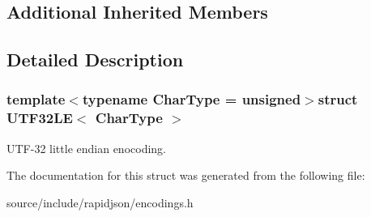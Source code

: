 \subsection*{Additional Inherited Members}


\subsection{Detailed Description}
\subsubsection*{template$<$typename Char\+Type = unsigned$>$struct U\+T\+F32\+L\+E$<$ Char\+Type $>$}

U\+T\+F-\/32 little endian enocoding. 

The documentation for this struct was generated from the following file\+:\begin{DoxyCompactItemize}
\item 
source/include/rapidjson/encodings.\+h\end{DoxyCompactItemize}
